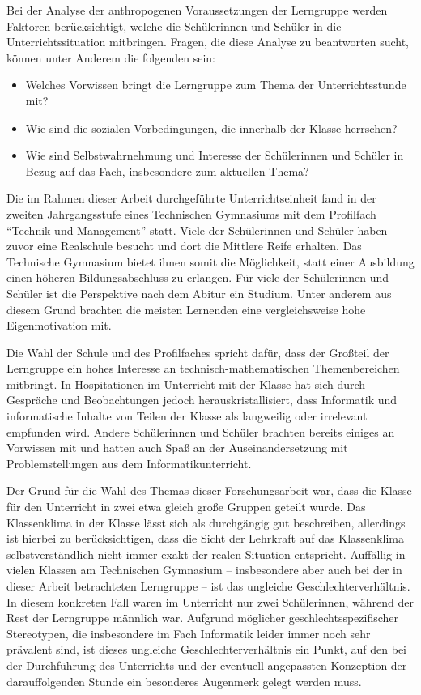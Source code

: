 Bei der Analyse der anthropogenen Voraussetzungen der Lerngruppe werden Faktoren berücksichtigt, welche die Schülerinnen und Schüler in die Unterrichtssituation mitbringen.
Fragen, die diese Analyse zu beantworten sucht, können unter Anderem die folgenden sein:
\begin{itemize}
	\item Welches Vorwissen bringt die Lerngruppe zum Thema der Unterrichtsstunde mit?
	\item Wie sind die sozialen Vorbedingungen, die innerhalb der Klasse herrschen?
	\item Wie sind Selbstwahrnehmung und Interesse der Schülerinnen und Schüler in Bezug auf das Fach, insbesondere zum aktuellen Thema?
\end{itemize}

Die im Rahmen dieser Arbeit durchgeführte Unterrichtseinheit fand in der zweiten Jahrgangsstufe eines Technischen Gymnasiums mit dem Profilfach ``Technik und Management'' statt.
Viele der Schülerinnen und Schüler haben zuvor eine Realschule besucht und dort die Mittlere Reife erhalten.
Das Technische Gymnasium bietet ihnen somit die Möglichkeit, statt einer Ausbildung einen höheren Bildungsabschluss zu erlangen.
Für viele der Schülerinnen und Schüler ist die Perspektive nach dem Abitur ein Studium.
Unter anderem aus diesem Grund brachten die meisten Lernenden eine vergleichsweise hohe Eigenmotivation mit.

Die Wahl der Schule und des Profilfaches spricht dafür, dass der Großteil der Lerngruppe ein hohes Interesse an technisch-mathematischen Themenbereichen mitbringt.
In Hospitationen im Unterricht mit der Klasse hat sich durch Gespräche und Beobachtungen jedoch herauskristallisiert, dass Informatik und informatische Inhalte von Teilen der Klasse als langweilig oder irrelevant empfunden wird.
Andere Schülerinnen und Schüler brachten bereits einiges an Vorwissen mit und hatten auch Spaß an der Auseinandersetzung mit Problemstellungen aus dem Informatikunterricht.

Der Grund für die Wahl des Themas dieser Forschungsarbeit war, dass die Klasse für den Unterricht in zwei etwa gleich große Gruppen geteilt wurde.
Das Klassenklima in der Klasse lässt sich als durchgängig gut beschreiben, allerdings ist hierbei zu berücksichtigen, dass die Sicht der Lehrkraft auf das Klassenklima selbstverständlich nicht immer exakt der realen Situation entspricht.
Auffällig in vielen Klassen am Technischen Gymnasium -- insbesondere aber auch bei der in dieser Arbeit betrachteten Lerngruppe -- ist das ungleiche Geschlechterverhältnis.
In diesem konkreten Fall waren im Unterricht nur zwei Schülerinnen, während der Rest der Lerngruppe männlich war.
Aufgrund möglicher geschlechtsspezifischer Stereotypen, die insbesondere im Fach Informatik leider immer noch sehr prävalent sind, ist dieses ungleiche Geschlechterverhältnis ein Punkt, auf den bei der Durchführung des Unterrichts und der eventuell angepassten Konzeption der darauffolgenden Stunde ein besonderes Augenmerk gelegt werden muss.

